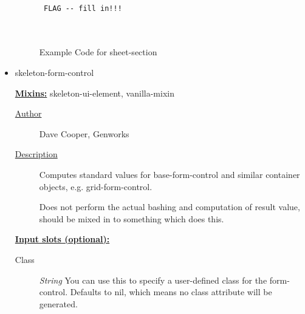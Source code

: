 \documentclass [11pt]{book}
\begin{document}
\begin{itemize}
\begin{figure}
\begin{lrbox}{\boxedverb}
\begin{minipage}{\linewidth}
{\small

\begin{verbatim}

 FLAG -- fill in!!!



\end{verbatim}}
\end{minipage}
\end{lrbox}
\fbox{\usebox{\boxedverb}}

\caption{Example Code for sheet-section}

\label{fig:example-code-sheet-section}

\end{figure}






\item {}skeleton-form-control


\textbf{
\underline{Mixins:}} skeleton-ui-element, vanilla-mixin





\begin{description}

\item [
\underline{Author}]


Dave Cooper, Genworks



\item [
\underline{Description}]


Computes standard values for base-form-control and similar container objects, e.g. grid-form-control.

Does not perform the actual bashing and computation of result value, should be mixed in to something which does this.



\end{description}








\textbf{
\underline{Input slots (optional):}}

\begin{description}

\item [Class]
\emph{String} You can use this to specify a user-defined class for the form-control. Defaults to nil, which means no class attribute will be generated.



\end{description}
\end{itemize}
\end{document}
